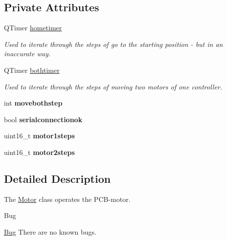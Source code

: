 \subsection*{Private Attributes}
\begin{DoxyCompactItemize}
\item 
Q\+Timer \hyperlink{classMotor_adbb59f89d592f1569ba8ad05c5c58a73}{hometimer}
\begin{DoxyCompactList}\small\item\em Used to iterate through the steps of \textquotesingle{}go to the starting position\textquotesingle{} -\/ but in an inaccurate way. \end{DoxyCompactList}\item 
\mbox{\label{classMotor_a97bf769ce21887450f412554520f4f20}} 
Q\+Timer \hyperlink{classMotor_a97bf769ce21887450f412554520f4f20}{bothtimer}
\begin{DoxyCompactList}\small\item\em Used to iterate through the steps of moving two motors of one controller. \end{DoxyCompactList}\item 
\mbox{\label{classMotor_a64cf23f01da50ffdfd3c5ba26ad44f1f}} 
int {\bfseries movebothstep}
\item 
\mbox{\label{classMotor_a65cf2259e3d3e61ea7e268b99f8089a0}} 
bool {\bfseries serialconnectionok}
\item 
\mbox{\label{classMotor_a09aaad8e6e0ea959ac4712677443d8f0}} 
uint16\+\_\+t {\bfseries motor1steps}
\item 
\mbox{\label{classMotor_af12031af563931e69915308aa0cce190}} 
uint16\+\_\+t {\bfseries motor2steps}
\end{DoxyCompactItemize}


\subsection{Detailed Description}
The \hyperlink{classMotor}{Motor} class operates the P\+C\+B-\/motor. 

\begin{DoxyRefDesc}{Bug}
\item[\hyperlink{bug__bug000004}{Bug}]There are no known bugs.\end{DoxyRefDesc}


